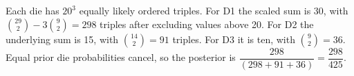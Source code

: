 Each die has $20^3$ equally likely ordered triples. For D1 the scaled sum is 30, with $\binom{29}2-3\binom92=298$ triples after excluding values above 20. For D2 the underlying sum is 15, with $\binom{14}2=91$ triples. For D3 it is ten, with $\binom92=36$. Equal prior die probabilities cancel, so the posterior is $\dfrac{298}{(298+91+36)}=\boxed{\dfrac{298}{425}}$.
